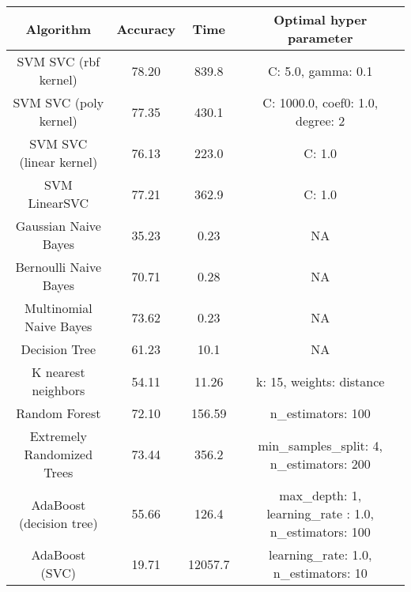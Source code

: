 \begin{center}
	\begin{tabular}{c|c|c|c}
    \hline
	     Algorithm   & Accuracy & Time & Optimal hyper parameter\\
         \hline
         SVM SVC (rbf kernel)   & 78.20  & 839.8 & C: 5.0, gamma: 0.1\\
         \hline
         SVM SVC (poly kernel)  & 77.35  & 430.1 & C: 1000.0, coef0: 1.0, degree: 2\\
         \hline
         SVM SVC (linear kernel)   &  76.13  & 223.0 & C: 1.0\\
         \hline
         SVM LinearSVC    &  77.21   &362.9  & C: 1.0\\
         \hline
         \hline
         Gaussian Naive Bayes & 35.23 & 0.23 & NA \\
         \hline
         Bernoulli Naive Bayes &   70.71    & 0.28  & NA \\
         \hline
         Multinomial Naive Bayes & 73.62 	& 0.23  & NA \\
         \hline
         \hline
         Decision Tree &  61.23 & 10.1 & NA \\
         \hline
         \hline
         K nearest neighbors & 54.11 & 11.26 & k: 15, weights:  distance\\
         \hline
         \hline
         Random Forest & 72.10 & 156.59 & n\_estimators: 100\\
         \hline
         Extremely Randomized Trees & 73.44 & 356.2 &
         min\_samples\_split: 4,
         n\_estimators: 200 \\
         \hline
         AdaBoost (decision tree) & 55.66 & 126.4 & max\_depth: 1, learning\_rate : 1.0, n\_estimators: 100\\
         \hline
         AdaBoost (SVC) & 19.71 & 12057.7 & learning\_rate: 1.0,
         n\_estimators: 10\\
         \hline
        
          \end{tabular}
\end{center}
